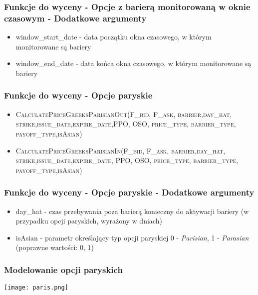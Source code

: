 \documentclass{beamer}
\begin{document}
\begin{frame}
  \frametitle{Funkcje do wyceny - Opcje z barierą monitorowaną w oknie czasowym - Dodatkowe argumenty}

\begin{itemize}
\item window\_start\_date - data początku okna czasowego, w którym monitorowane są bariery
\item window\_end\_date - data końca okna czasowego, w którym monitorowane są bariery
\end{itemize}

\end{frame}



\begin{frame}
  \frametitle{Funkcje do wyceny - Opcje paryskie}
  \begin{itemize}
  \item \small \textsc{CalculatePriceGreeksParisianOut(F\_bid, F\_ask, barrier,day\_hat, strike,issue\_date,expire\_date,PPO, OSO, price\_type, barrier\_type, payoff\_type,isAsian)}
  \item \small \textsc{CalculatePriceGreeksParisianIn(F\_bid, F\_ask, barrier,day\_hat, strike,issue\_date,expire\_date, PPO, OSO, price\_type, barrier\_type, payoff\_type,isAsian)}

  \end{itemize}
\end{frame}

\begin{frame}
  \frametitle{Funkcje do wyceny - Opcje paryskie - Dodatkowe argumenty}

\begin{itemize}
\item day\_hat - czas przebywania poza barierą konieczny do aktywacji bariery (w przypadku opcji paryskich, wyrażony w dniach)
\item isAsian - parametr określający typ opcji paryskiej 0 - \emph{Parisian}, 1 - \emph{Parasian} (poprawne wartości: 0, 1)
\end{itemize}

\end{frame}
\begin{frame}
  \frametitle{Modelowanie opcji paryskich}

\texttt{[image: paris.png]}
\end{frame}
\end{document}
